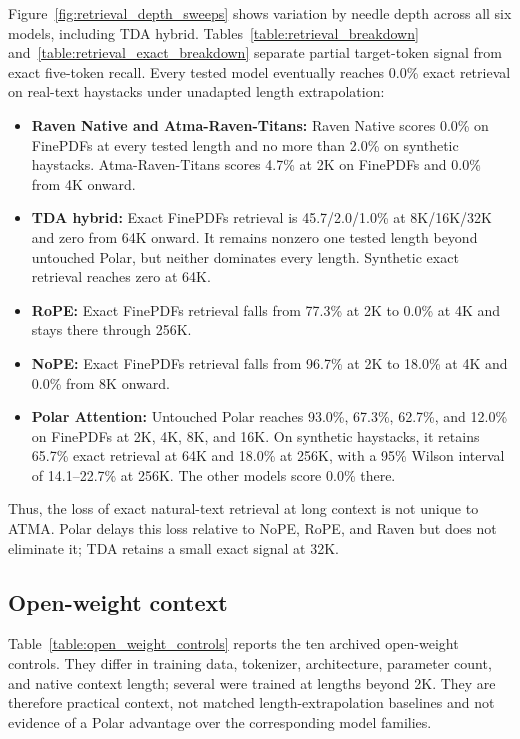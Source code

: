 Figure~\ref{fig:retrieval_depth_sweeps} shows variation by needle depth across all six models, including TDA hybrid. Tables~\ref{table:retrieval_breakdown} and~\ref{table:retrieval_exact_breakdown} separate partial target-token signal from exact five-token recall. Every tested model eventually reaches 0.0\% exact retrieval on real-text haystacks under unadapted length extrapolation:
\begin{itemize}
\item \textbf{Raven Native and Atma-Raven-Titans:} Raven Native scores 0.0\% on FinePDFs at every tested length and no more than 2.0\% on synthetic haystacks. Atma-Raven-Titans scores 4.7\% at 2K on FinePDFs and 0.0\% from 4K onward.
\item \textbf{TDA hybrid:} Exact FinePDFs retrieval is 45.7/2.0/1.0\% at 8K/16K/32K and zero from 64K onward. It remains nonzero one tested length beyond untouched Polar, but neither dominates every length. Synthetic exact retrieval reaches zero at 64K.
\item \textbf{RoPE:} Exact FinePDFs retrieval falls from 77.3\% at 2K to 0.0\% at 4K and stays there through 256K.
\item \textbf{NoPE:} Exact FinePDFs retrieval falls from 96.7\% at 2K to 18.0\% at 4K and 0.0\% from 8K onward.
\item \textbf{Polar Attention:} Untouched Polar reaches 93.0\%, 67.3\%, 62.7\%, and 12.0\% on FinePDFs at 2K, 4K, 8K, and 16K. On synthetic haystacks, it retains 65.7\% exact retrieval at 64K and 18.0\% at 256K, with a 95\% Wilson interval of 14.1--22.7\% at 256K. The other models score 0.0\% there.
\end{itemize}
Thus, the loss of exact natural-text retrieval at long context is not unique to ATMA. Polar delays this loss relative to NoPE, RoPE, and Raven but does not eliminate it; TDA retains a small exact signal at 32K.

\subsection{Open-weight context}
Table~\ref{table:open_weight_controls} reports the ten archived open-weight controls. They differ in training data, tokenizer, architecture, parameter count, and native context length; several were trained at lengths beyond 2K. They are therefore practical context, not matched length-extrapolation baselines and not evidence of a Polar advantage over the corresponding model families.

